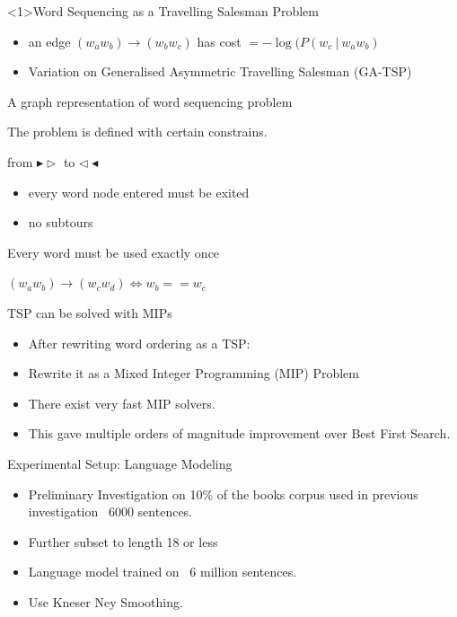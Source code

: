 \documentclass[]{beamer}
\newcommand{\widthtikz}[2]{\resizebox{#1\textwidth}{!}{}}
\newcommand{\fullwidthtikz}[1]{\resizebox{0.9\textwidth}{!}{}}
\begin{document}
\begin{frame}<1>{Word Sequencing as a Travelling Salesman Problem}
	\widthtikz{0.5}{../figs/ordergraph.pgf}
	\begin{itemize}
		\item an edge $(w_aw_b)\to (w_bw_c)$ has cost $=-\log(P(w_c\:|\:w_aw_b)$
		\item Variation on Generalised Asymmetric Travelling Salesman (GA-TSP)
	\end{itemize}
\end{frame}

\begin{frame}{A graph representation of word sequencing problem}
	\fullwidthtikz{../figs/ordergraph.pgf}
\end{frame}

\begin{frame}{The problem is defined with certain constrains.}
	\widthtikz{0.5}{../figs/ordergraph.pgf}
	\begin{description}
		\item<1-> [Single Path] from $\blacktriangleright\triangleright$ to $\triangleleft\blacktriangleleft$
		\begin{itemize}
			\item every word node entered must be exited
			\item no subtours
		\end{itemize}
		\item<2-> [Districts] Every word must be used exactly once
		\item<3-> [Markov Consistency] $(w_aw_b)\to (w_cw_d) \iff w_b==w_c$
	\end{description}
\end{frame}



\begin{frame}{TSP can be solved with MIPs}
	\begin{itemize}
		\item After rewriting word ordering as a TSP:
		\item Rewrite it as a Mixed Integer Programming (MIP) Problem
		\item There exist very fast MIP solvers.
		\item This gave multiple orders of magnitude improvement over Best First Search.
	\end{itemize}
\end{frame}

\begin{frame}{Experimental Setup: Language Modeling}
	\begin{itemize}
		\item<1-> Preliminary Investigation on 10\% of the books corpus used in previous investigation ~6000 sentences.
		\item<1-> Further subset to length 18 or less
		\vfill
		\item<2-> Language model trained on ~6 million sentences.
		\item<2-> Use Kneser Ney Smoothing. 
		
	\end{itemize}
\end{frame}
\end{document}
